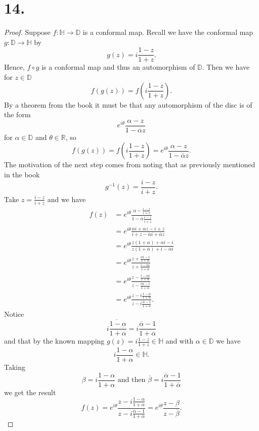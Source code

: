 \documentclass{article}
\begin{document}
\section*{14.}
\begin{proof}
  Suppose $f:\mathbb{H} \to \mathbb{D}$ is a conformal map. 
 Recall we have the conformal map $g: \mathbb{D} \to \mathbb{H}$ by 
 \[
 g(z) = i \frac{1 - z}{1 + z}. 
 \] 
 Hence, $f \circ g$ is a conformal map and thus an automorphism of $\mathbb{D}$. Then we have for $z \in \mathbb{D}$
 \[
 f(g(z)) = f\left(i \frac{1 - z}{1 + z} \right). 
 \]
 By a theorem from the book it must be that any automorphism of the disc is of the form 
 \[
 e^{i \theta} \frac{\alpha - z}{1 - \overline{\alpha}z} 
 \]
 for $\alpha\in \mathbb{D}$ and $\theta \in \mathbb{R}$, so 
 \[
  f(g(z)) = f\left(i \frac{1 - z}{1 + z} \right) = e^{i \theta} \frac{\alpha - z}{1 - \overline{\alpha}z}.
 \]
 The motivation of the next step comes from noting that as previously mentioned in the book
 \[
 g^{-1}(z) = \frac{i - z}{i + z}. 
 \]
 Take $z = \frac{i - z}{i + z}$ and we have 
 \begin{align*}
  f(z) &= e^{i \theta} \frac{\alpha - \frac{i - z}{i + z}}{1 - \overline{\alpha} \frac{i - z}{i + z}} \\
  &= e^{i \theta} \frac{\alpha i + \alpha z - i + z}{i + z - \overline{\alpha}i + \overline{\alpha}z} \\
  &= e^{i \theta} \frac{z(1 + \alpha) + \alpha i - i}{z(1 + \overline{\alpha}) + i -\overline{\alpha}i} \\
  &= e^{i \theta} \frac{z + \frac{\alpha i - i }{1 + \alpha}}{z + \frac{i - \overline{\alpha}i}{1 + \overline{\alpha}}}\\
  &= e^{i \theta}\frac{z - \frac{i - \alpha i}{1 + \alpha}}{z - \frac{\overline{\alpha}i - i}{1 + \overline{\alpha}}}\\
  &= e^{i \theta} \frac{z - i\frac{1 - \alpha}{1 + \alpha}}{z - i \frac{\overline{\alpha} - 1}{1 + \overline{\alpha}}}.
 \end{align*}
 Notice 
 \[
 \overline{i\frac{1 - \alpha }{1 + \alpha}} = i\frac{\overline{\alpha}- 1}{1 + \overline{\alpha}} 
 \]
and that by the known mapping $g(z) = i\frac{1 - z}{1 + z} \in \mathbb{H}$ and with $\alpha \in \mathbb{D}$ we have 
\[
   i\frac{1 - \alpha}{1 + \alpha} \in \mathbb{H}.
\]
 Taking 
 \[
 \beta =  i\frac{1 - \alpha }{1 + \alpha} \text{ and then } \overline{\beta} = i\frac{\overline{\alpha} - 1}{1 + \overline{\alpha}} 
 \]
 we get the result 
 \[
 f(z) = e^{i \theta}\frac{z - i\frac{1 - \alpha }{1 + \alpha}}{z - i\frac{\overline{\alpha} - 1}{1 + \overline{\alpha}}} = e^{i \theta}\frac{z - \beta}{z - \overline{\beta}}.
 \]
\end{proof}
\end{document}
